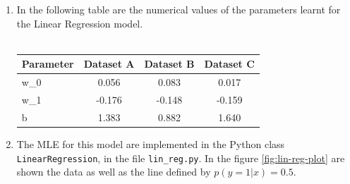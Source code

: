 \documentclass[a4paper, 11pt]{report}
\begin{document}
\begin{enumerate}[label=\alph*]
    \item In the following table are the numerical values of the parameters learnt for the Linear Regression model. \\
    \\
        \begin{tabular}{ | l || *{3}{c| } }
             \hline
                Parameter & Dataset A & Dataset B & Dataset C \\
             \hline			
               w_0 & 0.056 & 0.083 & 0.017 \\
               w_1 & -0.176 & -0.148 & -0.159 \\
               b & 1.383 & 0.882 & 1.640 \\
             \hline  
         \end{tabular}
    
    \item The MLE for this model are implemented in the Python class \texttt{LinearRegression}, in the file \texttt{lin\_reg.py}. In the figure \ref{fig:lin-reg-plot} are shown the data as well as the line defined by $p \left( y=1 | x \right) = 0.5$.
    

\end{enumerate}
\end{document}
